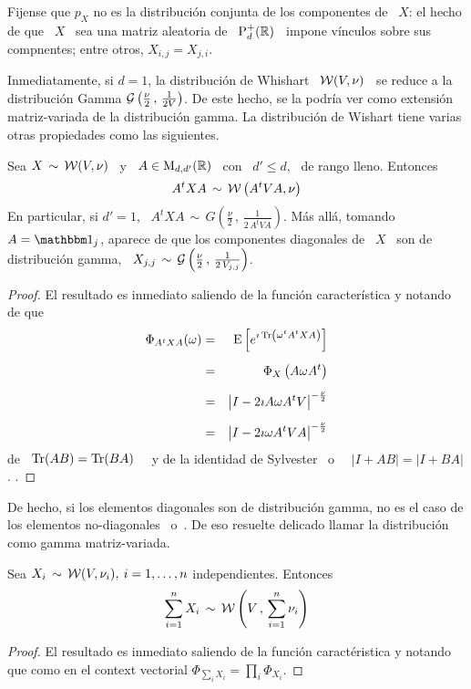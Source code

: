 Fijense que $p_X$ no es la  distribuci\'on conjunta de los componentes de \ $X$:
el hecho de que \ $X$ \ sea una matriz aleatoria de \ $\mathrm{P}_d^+(\mathbb{R})$ \ impone
v\'inculos sobre sus compnentes; entre otros, $X_{i,j} = X_{j,i}$.

Inmediatamente, si  $d = 1$, la  distribuci\'on de Whishart \  $\mathcal{W}(V,\nu)$ \ se
reduce  a la  distribuci\'on Gamma  $\mathcal{G}\left(\frac{\nu}{2} \,  , \,  \frac1{2 V}
\right)$. De este  hecho, se la podr\'ia ver  como extensi\'on matriz-variada de
la  distribuci\'on  gamma.  La  distribuci\'on  de  Wishart  tiene varias  otras
propiedades como las siguientes.
%
\begin{lema}
\label{Lem:MP:StabilidadWishartLineal}
%
Sea $X \, \sim \, \mathcal{W}(V,\nu)$ \ y  \ $A \in \mathrm{M}_{d,d'}(\mathbb{R})$ \ con \ $d' \le d$,
\ de rango lleno. Entonces
  \[
  A^t X A \, \sim \, \mathcal{W}\left( A^t V A , \nu \right)
  \]
  En particular, si $d'  = 1$, \ $A^t X A \, \sim  \, G\left( \frac{\nu}{2} \, ,
    \, \frac1{2 \, A^t V A} \right)$. M\'as all\'a, tomando $A = \un_j$, aparece
  de que  los componentes diagonales de \  $X$ \ son de  distribuci\'on gamma, \
  $X_{j,j}  \, \sim  \,  \mathcal{G}\left( \frac{\nu}{2}  \,  , \,  \frac1{2 \,  V_{j,j}}
  \right)$.
\end{lema}
%
\begin{proof}
  El resultado es inmediato saliendo  de la funci\'on caracter\'istica y notando
  de que
%
\begin{eqnarray*}
\Phi_{A^t X A}(\omega) & = & \Esp\left[ e^{\imath \Tr\left( \omega^t A^t X A
\right)}\right]\\[2mm]
%
& = & \Phi_X\left( A \omega A^t\right)\\[2mm]
%
& = &  \left| I - 2 \imath A \omega A^t V \right|^{-\frac{\nu}{2}}\\[2mm]
%
& = &  \left| I - 2 \imath \omega A^t V A \right|^{-\frac{\nu}{2}}
%
\end{eqnarray*}
%
de   \   $\operatorname{Tr}(AB)   =   \operatorname{Tr}(BA)$~\cite{Har08}   \   y   de   la   identidad   de
Sylvester~\cite{Syl51,  AkrAkr96}  o~\cite[\S~18.1]{Har08} \  $\left|  I  + A  B
\right| = \left| I + B A \right|$.  .
\end{proof}
%
De hecho, si los elementos diagonales son de distribuci\'on gamma, no es el caso
de         los        elementos         no-diagonales~\cite{Seb04,        And03}
o~\cite[Teo.~3.3.4]{GupNag99}.    De    eso   resuelte   delicado    llamar   la
distribuci\'on como gamma matriz-variada.

\begin{lema}
\label{Lem:MP:StabilidadWishartSuma}
%
  Sea $X_i \,  \sim \, \mathcal{W}(V,\nu_i), \: i = 1,\ldots,n$ independientes. Entonces
  \[
  \sum_{i=1}^n X_i \, \sim \, \mathcal{W}\left( V \, , \, \sum_{i=1}^n \nu_i \right)
  \]
\end{lema}
%
\begin{proof}
  El resultado es inmediato saliendo  de la funci\'on caract\'eristica y notando
  que como en el context vectorial $\Phi_{\sum_i X_i} = \prod_i \Phi_{X_i}$.
\end{proof}

